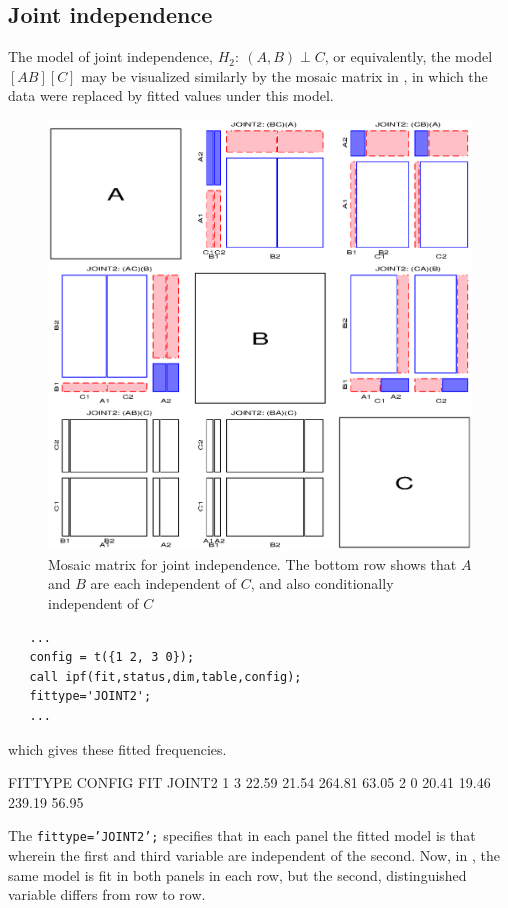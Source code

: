 \subsection{Joint independence}
The model of joint independence, $H_2: \: (A, B) \perp C$, or
equivalently, the \loglin{} model $[A B][C]$
may be visualized similarly by the mosaic matrix in ,
in which the data were replaced by fitted values under this model.
\begin{figure}[htb]
  \centering
  \includegraphics[scale=.6]{ch4/fig/mosfit-21}
  \caption[Mosaic matrix for joint independence]{Mosaic matrix for joint independence.  The bottom row shows that $A$ and $B$ are each independent
 of $C$, and  also
conditionally independent of $C$}%
  \label{fig:mosfit-21}
\end{figure}
\begin{verbatim}
   ...
   config = t({1 2, 3 0});
   call ipf(fit,status,dim,table,config);
   fittype='JOINT2';
   ...
\end{verbatim}
which gives these fitted frequencies.
\begin{output}
   FITTYPE  CONFIG        FIT
   JOINT2      1   3    22.59   21.54  264.81   63.05
               2   0    20.41   19.46  239.19   56.95
\end{output}
The \texttt{fittype='JOINT2';} specifies that in each panel the fitted model
is that wherein the first and third variable are independent of the second.
Now, in , the same model is fit in both panels in
each row,  but the second, distinguished variable differs from
row to row.

